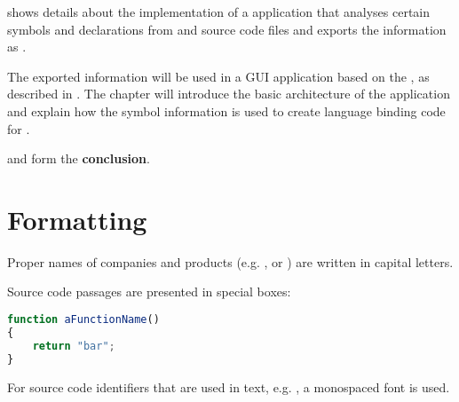  shows details about the implementation of a  application that analyses certain symbols and declarations from  and  source code files and exports the information as .

The exported information will be used in a GUI application based on the , as described in . The chapter will introduce the basic architecture of the application and explain how the symbol information is used to create language binding code for .

 and  form the \textbf{conclusion}.

\section{Formatting}

Proper names of companies and products (e.g. ,   or ) are written in capital letters.

Source code passages are presented in special boxes:

\SingleSpacing
\begin{lstlisting}[language=JavaScript, caption=Example source code]
function aFunctionName()
{
	return "bar";
}
\end{lstlisting}
\OnehalfSpacing

For source code identifiers that are used in text, e.g. , a monospaced font is used.





